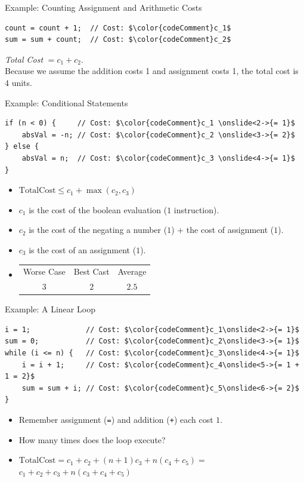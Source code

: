 \documentclass[14pt,aspectratio=1610, hyperref={pdfpagelayout=SinglePage}]{beamer}
\begin{document}
\begin{frame}[fragile]{Example: Counting Assignment and Arithmetic Costs}
\begin{lstlisting}[mathescape]
count = count + 1;  // Cost: $\color{codeComment}c_1$
sum = sum + count;  // Cost: $\color{codeComment}c_2$ 
\end{lstlisting}
\vspace{2em}
\emph{Total Cost} \(= c_1 + c_2\). \\[1em]
Because we assume the addition costs 1 and assignment costs 1, the total cost is 4 units.
\end{frame}

\begin{frame}[fragile]{Example: Conditional Statements}
\begin{lstlisting}[mathescape]
if (n < 0) {     // Cost: $\color{codeComment}c_1 \onslide<2->{= 1}$
    absVal = -n; // Cost: $\color{codeComment}c_2 \onslide<3->{= 2}$
} else {
    absVal = n;  // Cost: $\color{codeComment}c_3 \onslide<4->{= 1}$
}
\end{lstlisting}
\begin{itemize}[<+->]
\item
  \(\mathrm{Total Cost} \le c_1 + \max(c_2, c_3)\)
\item \(c_1\) is the cost of the boolean evaluation (\(1\) instruction).
\item \(c_2\) is the cost of the negating a number (\(1\)) + the cost of assignment (\(1\)).
\item \(c_3\) is the cost of an assignment (\(1\)).
\item
  \begin{tabular}{ccc}
    Worse Case & Best Cast & Average\\
    \(3\) & \(2\) & \(2.5\)
  \end{tabular}
\end{itemize}
\end{frame}

\begin{frame}[fragile]{Example: A Linear Loop}
\begin{lstlisting}[mathescape]
i = 1;             // Cost: $\color{codeComment}c_1\onslide<2->{= 1}$
sum = 0;           // Cost: $\color{codeComment}c_2\onslide<3->{= 1}$
while (i <= n) {   // Cost: $\color{codeComment}c_3\onslide<4->{= 1}$
    i = i + 1;     // Cost: $\color{codeComment}c_4\onslide<5->{= 1 + 1 = 2}$
    sum = sum + i; // Cost: $\color{codeComment}c_5\onslide<6->{= 2}$
}
\end{lstlisting}
\begin{itemize}
\item<5-> Remember assignment (\lstinline{=}) and addition (\lstinline{+}) each cost \(1\).
\item<7-> How many times does the loop execute?\\
\item<9-> \(\mathrm{Total Cost} = c_1 + c_2 + (n+1) c_3 + n \left(c_4 + c_5\right) =\) \\
\(c_1 + c_2 + c_3 + n\left(c_3 + c_4 + c_5\right)\)
\end{itemize}
\end{frame}
\end{document}
